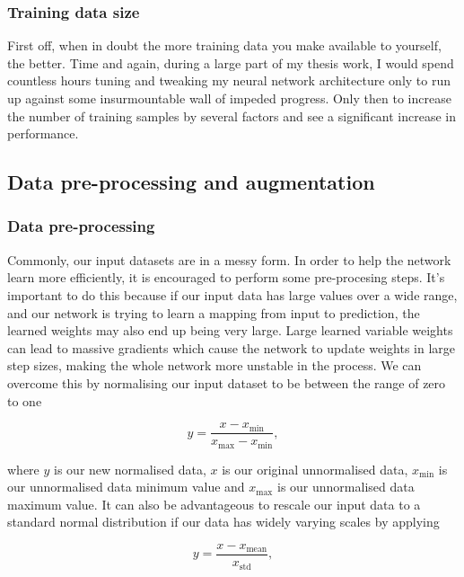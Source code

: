 %
%

\subsubsection{Training data size}
First off, when in doubt the more training data you make available to yourself, the better.
Time and again, during a large part of my thesis work, I would spend countless hours tuning and tweaking my neural network architecture only to run up against some insurmountable wall of impeded progress. Only then to increase the number of training samples by several factors and see a significant increase in performance. 

\subsection{Data pre-processing and augmentation}

\subsubsection{Data pre-processing}
Commonly, our input datasets are in a messy form. In order to help the network learn more efficiently, it is encouraged to perform some pre-procesing steps. It's important to do this because if our input data has large values over a wide range, and our network is trying to learn a mapping from input to prediction, the learned weights may also end up being very large. Large learned variable weights can lead to massive gradients which cause the network to update weights in large step sizes, making the whole network more unstable in the process. We can overcome this by normalising our input dataset to be between the range of zero to one 

\begin{equation}
    y = \frac{x - x_{\textrm{min}}}{x_{\textrm{max}}-x_{\textrm{min}}},
\end{equation}

where $y$ is our new normalised data, $x$ is our original unnormalised data, $x_{\textrm{min}}$ is our unnormalised data minimum value and $x_{\textrm{max}}$ is our unnormalised data maximum value. It can also be advantageous to rescale our input data to a standard normal distribution if our data has widely varying scales by applying 

\begin{equation}
    y = \frac{x - x_{\textrm{mean}}}{x_{\textrm{std}}},
\end{equation}

